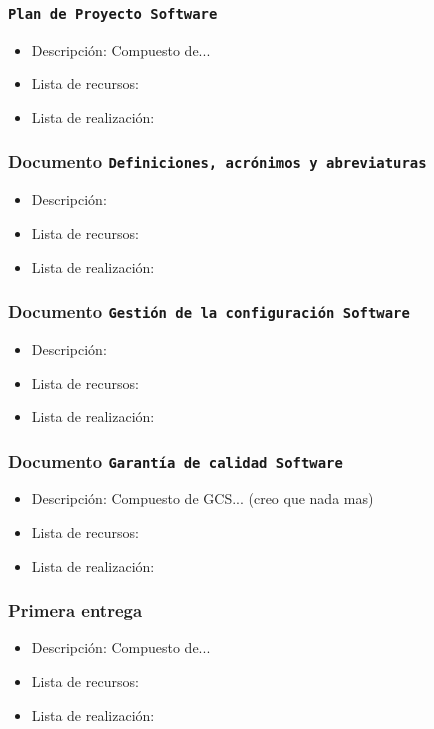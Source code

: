 \documentclass[spanish,a4paper,11pt, twoside]{report}	%
\begin{document}
			\subsubsection{\texttt{Plan de Proyecto Software}}
			\begin{itemize}	
				\item{Descripción:} Compuesto de...
				\item{Lista de recursos:}
				\item{Lista de realización:}
			\end{itemize}	

			\subsubsection{Documento \texttt{Definiciones, acrónimos y abreviaturas}}
			\begin{itemize}	
				\item{Descripción:}
				\item{Lista de recursos:}
				\item{Lista de realización:}
			\end{itemize}		

			\subsubsection{Documento \texttt{Gestión de la configuración Software}}
			\begin{itemize}	
				\item{Descripción:}
				\item{Lista de recursos:}
				\item{Lista de realización:}
			\end{itemize}	

			\subsubsection{Documento \texttt{Garantía de calidad Software}}
			\begin{itemize}	
				\item{Descripción:} Compuesto de GCS... (creo que nada mas)
				\item{Lista de recursos:}
				\item{Lista de realización:}
			\end{itemize}	

			\subsubsection{Primera entrega}
			\begin{itemize}	
				\item{Descripción:} Compuesto de...
				\item{Lista de recursos:}
				\item{Lista de realización:}
			\end{itemize}	
\end{document}
